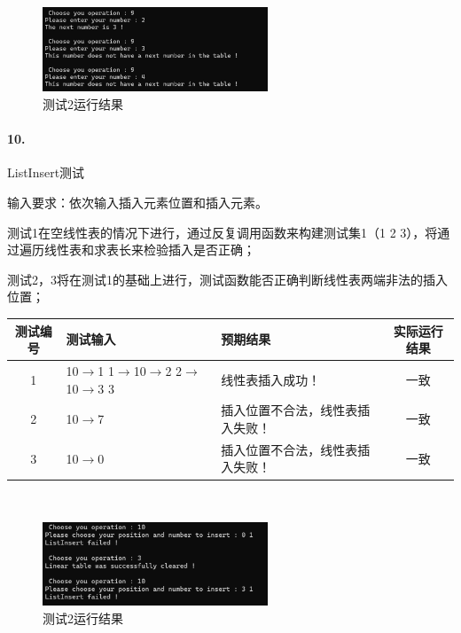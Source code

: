 \documentclass[supercite]{Experimental_Report}
\theoremstyle{definition}
\begin{document}
~\

 \begin{figure}[H]
 	\centering
 	\includegraphics[width=0.6\textwidth]{images/线性表测试9.png}
 	\caption{测试2运行结果}
 	\label{txlab}
 \end{figure}


\paragraph{10.}ListInsert测试

	输入要求：依次输入插入元素位置和插入元素。

	测试1在空线性表的情况下进行，通过反复调用函数来构建测试集1（1 2 3），将通过遍历线性表和求表长来检验插入是否正确；

	测试2，3将在测试1的基础上进行，测试函数能否正确判断线性表两端非法的插入位置；

\vspace{0.5em}

\begin{tabular}{|c|p{2.8cm}|p{5cm}|c|}
	\hline
	测试编号 & 测试输入 & 预期结果 & 实际运行结果 \\
	\hline
	1 & 10$\rightarrow$1 1$\rightarrow$10$\rightarrow$2 2$\rightarrow$10$\rightarrow$3 3 & 线性表插入成功！ & 一致 \\
	\hline
	2 & 10$\rightarrow$7 & 插入位置不合法，线性表插入失败！ & 一致 \\
	\hline
	3 & 10$\rightarrow$0 & 插入位置不合法，线性表插入失败！ & 一致 \\
	\hline
\end{tabular}

~\

 \begin{figure}[H]
 	\centering
 	\includegraphics[width=0.6\textwidth]{images/线性表测试10.png}
 	\caption{测试2运行结果}
 	\label{txlab}
 \end{figure}
\end{document}
